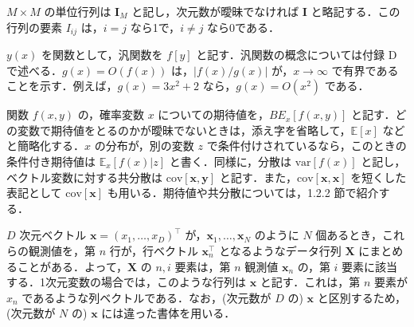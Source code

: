 \documentclass[uplatex,a4paper,oneside,openany,dvipdfmx]{jsarticle}
\numberwithin{equation}{section}
\theoremstyle{mystyle} %
\newcommand{\BE}{\mathbb{E}}
\newcommand{\bs}[1]{\boldsymbol{#1}}
\begin{document}
$M \times M$ の単位行列は $\bs{I}_{M}$ と記し，次元数が曖昧でなければ $\bs{I}$ と略記する．この行列の要素 $I_{ij}$ は，$i=j$ なら1で，$i \neq j$ なら0である．

$y(x)$ を関数として，汎関数を $f[y]$ と記す．汎関数の概念については付録 D で述べる．$g(x) = O(f(x))$ は，$|f(x)/g(x)|$ が，$x \rightarrow \infty$ で有界であることを示す．例えば，$g(x) = 3x^{2} + 2$ なら，$g(x) = O(x^{2})$ である．

関数 $f(x,y)$ の，確率変数 $x$ についての期待値を，$BE_{x}[f(x,y)]$ と記す．どの変数で期待値をとるのかが曖昧でないときは，添え字を省略して，$\BE[x]$ などと簡略化する．$x$ の分布が，別の変数 $z$ で条件付けされているなら，このときの条件付き期待値は $\BE_{x}[f(x)|z]$ と書く．同様に，分散は $\text{var}[f(x)]$ と記し，ベクトル変数に対する共分散は $\text{cov}[\bs{x},\bs{y}]$ と記す．また，$\text{cov}[\bs{x},\bs{x}]$ を短くした表記として $\text{cov}[\bs{x}]$ も用いる．期待値や共分散については，1.2.2 節で紹介する．

$D$ 次元ベクトル $\bs{x} = (x_{1},\ldots,x_{D})^{\top}$ が，$\bs{x}_{1},\ldots,\bs{x}_{N}$ のように $N$ 個あるとき，これらの観測値を，第 $n$ 行が，行ベクトル $\bs{x}_{n}^{\top}$ となるようなデータ行列 $\bs{X}$ にまとめることがある．よって，$\bs{X}$ の $n,i$ 要素は，第 $n$ 観測値 $\bs{x}_{n}$ の，第 $i$ 要素に該当する．1次元変数の場合では，このような行列は $\bs{x}$ と記す．これは，第 $n$ 要素が $x_{n}$ であるような列ベクトルである．なお，(次元数が $D$ の) $\bs{x}$ と区別するため，(次元数が $N$ の) $\bs{x}$ には違った書体を用いる．
\end{document}
